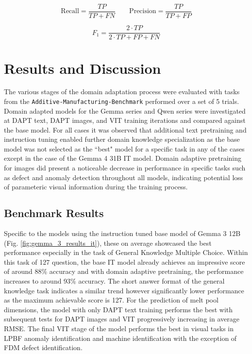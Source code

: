 \begin{equation}
\label{eq:recall_and_precision}
\text{Recall} = \frac{TP}{TP + FN} \qquad \text{Precision} = \frac{TP}{TP + FP}
\end{equation}

\begin{equation}
\label{eq:f1}
F_1 = \frac{2 \cdot TP}{2 \cdot TP + FP + FN}
\end{equation}

\section{Results and Discussion}
The various stages of the domain adaptation process were evaluated with tasks
from the \texttt{Additive-\allowbreak Manufacturing-\allowbreak Benchmark}
performed over a set of 5 trials. Domain adapted models for the Gemma series and
Qwen series were investigated at DAPT text, DAPT images, and VIT training
iterations and compared against the base model. For all cases it was observed
that additional text pretraining and instruction tuning enabled further domain
knowledge specialization as the base model was not selected as the ``best" model
for a specific task in any of the cases except in the case of the Gemma 4 31B IT
model. Domain adaptive pretraining for images did present a noticeable decrease
in performance in specific tasks such as defect and anomaly detection throughout
all models, indicating potential loss of parameteric visual information during
the training process.

\subsection{Benchmark Results}
Specific to the models using the instruction tuned base model of Gemma 3 12B (Fig.
\ref{fig:gemma_3_results_it}), these on average showcased the best performance
especially in the task of General Knowledge Multiple Choice. Within this task of
127 question, the base IT model already achieves an impressive score of around
88\% accuracy and with domain adaptive pretraining, the performance increases to
around 93\% accuracy. The short answer format of the general knowledge task
indicates a similar trend however significantly lower performance as the maximum
achievable score is 127. For the prediction of melt pool dimensions, the model
with only DAPT text training performs the best with subsequent tests for DAPT
images and VIT progressively increasing in average RMSE. The final VIT stage of
the model performs the best in visual tasks in LPBF anomaly identification and
machine identification with the exception of FDM defect identification.

